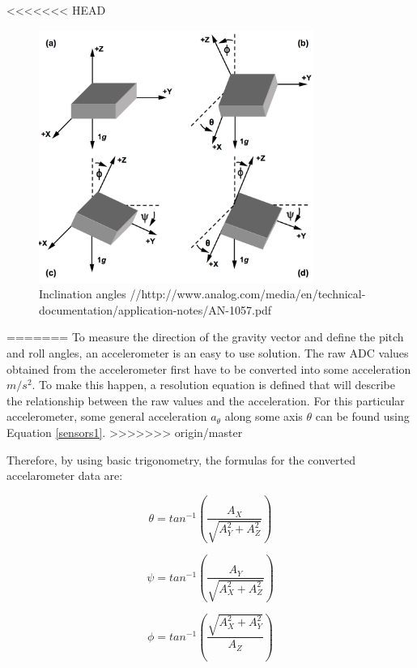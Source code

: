<<<<<<< HEAD
\begin{figure}[H]
  \centering
    \includegraphics[width=0.8\textwidth]{images/accangle.png}
	\caption{Inclination angles //http://www.analog.com/media/en/technical-documentation/application-notes/AN-1057.pdf}
	\label{acc}
\end{figure} 
=======
To measure the direction of the gravity vector and define the pitch and roll angles, an accelerometer is an easy to use solution.
The raw ADC values obtained from the accelerometer first have to be converted into some acceleration $m/s^2$. To make this happen, a resolution equation is defined that will describe the relationship between the raw values and the acceleration.
For this particular accelerometer, some general acceleration $a_\theta $ along some axis $\theta$ can be found using Equation \ref{sensors1}.
>>>>>>> origin/master

Therefore, by using basic trigonometry, the formulas for the converted accelarometer data are:

\begin{equation}	
 	\theta=tan^{-1}(\frac{A_{X}}{\sqrt{A_{Y}^{2}+A_{Z}^{2}}})
 \end{equation}
 
 \begin{equation}	
 	\psi=tan^{-1}(\frac{A_{Y}}{\sqrt{A_{X}^{2}+A_{Z}^{2}}})
 \end{equation}
 
 \begin{equation}	
 	\phi=tan^{-1}(\frac{\sqrt{A_{X}^{2}+A_{Y}^{2}}}{A_{Z}})
 \end{equation}
 
